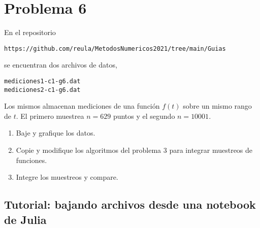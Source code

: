 \documentclass[11pt]{article}
\begin{document}
    \hypertarget{problema-6}{%
\section*{Problema 6}\label{problema-6}}

En el repositorio

\begin{verbatim}
https://github.com/reula/MetodosNumericos2021/tree/main/Guias
\end{verbatim}

se encuentran dos archivos de datos,

\begin{verbatim}
mediciones1-c1-g6.dat 
mediciones2-c1-g6.dat
\end{verbatim}

Los mismos almacenan mediciones de una función \(f(t)\) sobre un mismo
rango de \(t\). El primero muestrea \(n=629\) puntos y el segundo
\(n=10001\).

\begin{enumerate}
\def\labelenumi{\arabic{enumi}.}
\item
  Baje y grafique los datos.
\item
  Copie y modifique los algoritmos del problema 3 para integrar
  muestreos de funciones.
\item
  Integre los muestreos y compare.
\end{enumerate}

    \hypertarget{tutorial-bajando-archivos-desde-una-notebook-de-julia}{%
\subsection*{Tutorial: bajando archivos desde una notebook de
Julia}\label{tutorial-bajando-archivos-desde-una-notebook-de-julia}}
\end{document}
